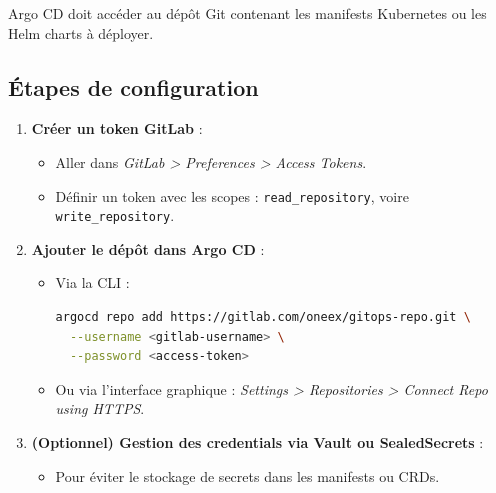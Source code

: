 Argo CD doit accéder au dépôt Git contenant les manifests Kubernetes ou les Helm charts à déployer.

\subsection{Étapes de configuration}

\begin{enumerate}
	\item \textbf{Créer un token GitLab} :
	      \begin{itemize}
		      \item Aller dans \emph{GitLab > Preferences > Access Tokens}.
		      \item Définir un token avec les scopes : \texttt{read\_repository}, voire \texttt{write\_repository}.
	      \end{itemize}


	\item \textbf{Ajouter le dépôt dans Argo CD} :
	      \begin{itemize}
		      \item Via la CLI :
		            \begin{lstlisting}[language=bash]
argocd repo add https://gitlab.com/oneex/gitops-repo.git \
  --username <gitlab-username> \
  --password <access-token>
	      	      \end{lstlisting}
		      \item Ou via l’interface graphique : \emph{Settings > Repositories > Connect Repo using HTTPS}.
	      \end{itemize}


	\item \textbf{(Optionnel) Gestion des credentials via Vault ou SealedSecrets} :
	      \begin{itemize}
		      \item Pour éviter le stockage de secrets dans les manifests ou CRDs.
	      \end{itemize}
\end{enumerate}

